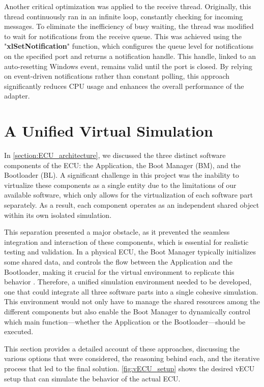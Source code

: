 Another critical optimization was applied to the receive thread. Originally, this thread continuously ran in an infinite loop, constantly checking for incoming messages. To eliminate the inefficiency of busy waiting, the thread was modified to wait for notifications from the receive queue. This was achieved using the "\textbf{xlSetNotification}" function, which configures the queue level for notifications on the specified port and returns a notification handle. This handle, linked to an auto-resetting Windows event, remains valid until the port is closed. By relying on event-driven notifications rather than constant polling, this approach significantly reduces CPU usage and enhances the overall performance of the adapter.

\section{A Unified Virtual Simulation}
In \autoref{section:ECU_architecture}, we discussed the three distinct software components of the ECU: the Application, the Boot Manager (BM), and the Bootloader (BL). A significant challenge in this project was the inability to virtualize these components as a single entity due to the limitations of our available software, which only allows for the virtualization of each software part separately. As a result, each component operates as an independent shared object within its own isolated simulation.

This separation presented a major obstacle, as it prevented the seamless integration and interaction of these components, which is essential for realistic testing and validation. In a physical ECU, the Boot Manager typically initializes some shared data, and controls the flow between the Application and the Bootloader, making it crucial for the virtual environment to replicate this behavior \cite{embeddedartistry_before_main}. Therefore, a unified simulation environment needed to be developed, one that could integrate all three software parts into a single cohesive simulation. This environment would not only have to manage the shared resources among the different components but also enable the Boot Manager to dynamically control which main function—whether the Application or the Bootloader—should be executed.

This section provides a detailed account of these approaches, discussing the various options that were considered, the reasoning behind each, and the iterative process that led to the final solution. \autoref{fig:vECU_setup} shows the desired vECU setup that can simulate the behavior of the actual ECU. 

